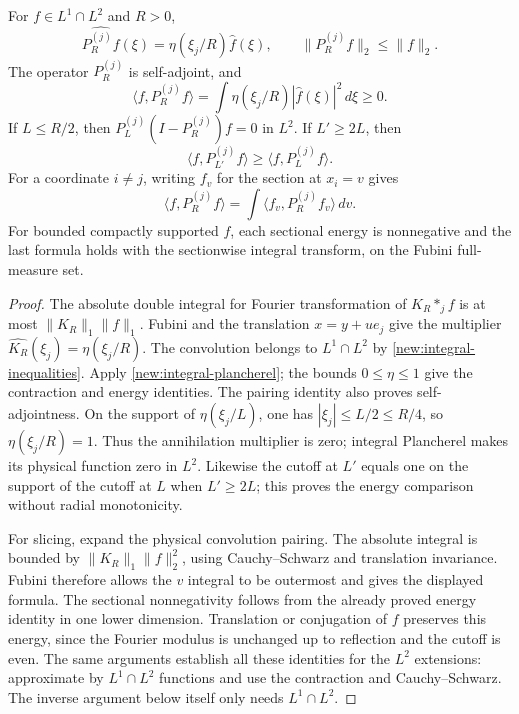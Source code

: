 \documentclass[11pt]{article}
\theoremstyle{definition}
\begin{document}
\begin{lemma}\label{new:multiplier-facts}
For $f\in L^1\cap L^2$ and $R>0$,
\[
 \widehat{P_R^{(j)}f}(\xi)=\eta(\xi_j/R)\widehat f(\xi),
 \qquad \|P_R^{(j)}f\|_2\leq\|f\|_2.
\]
The operator $P_R^{(j)}$ is self-adjoint, and
\[
 \langle f,P_R^{(j)}f\rangle
 =\int\eta(\xi_j/R)|\widehat f(\xi)|^2\,d\xi\geq0.
\]
If $L\leq R/2$, then $P_L^{(j)}(I-P_R^{(j)})f=0$ in $L^2$. If $L'\geq2L$, then
\[
 \langle f,P_{L'}^{(j)}f\rangle\geq\langle f,P_L^{(j)}f\rangle.
\]
For a coordinate $i\ne j$, writing $f_v$ for the section at $x_i=v$ gives
\[
 \langle f,P_R^{(j)}f\rangle=\int\langle f_v,P_R^{(j)}f_v\rangle\,dv.
\]
For bounded compactly supported $f$, each sectional energy is nonnegative and the last formula
holds with the sectionwise integral transform, on the Fubini full-measure set.
\end{lemma}
\begin{proof}
The absolute double integral for Fourier transformation of $K_R*_{j}f$ is at most
$\|K_R\|_1\|f\|_1$. Fubini and the translation $x=y+ue_j$ give the multiplier
$\widehat{K_R}(\xi_j)=\eta(\xi_j/R)$. The convolution belongs to $L^1\cap L^2$ by
\cref{new:integral-inequalities}. Apply \cref{new:integral-plancherel}; the bounds
$0\leq\eta\leq1$ give the contraction and energy identities. The pairing identity also
proves self-adjointness. On the support of $\eta(\xi_j/L)$, one has
$|\xi_j|\leq L/2\leq R/4$, so $\eta(\xi_j/R)=1$. Thus the annihilation multiplier is
zero; integral Plancherel makes its physical function zero in $L^2$.
Likewise the cutoff at $L'$ equals one on the support of the cutoff at $L$ when $L'\geq2L$;
this proves the energy comparison without radial monotonicity.

For slicing, expand the physical convolution pairing. The absolute integral is bounded by
$\|K_R\|_1\|f\|_2^2$, using Cauchy--Schwarz and translation invariance. Fubini therefore
allows the $v$ integral to be outermost and gives the displayed formula. The sectional
nonnegativity follows from the already proved energy identity in one lower dimension.
Translation or conjugation of $f$ preserves this energy, since the Fourier modulus is
unchanged up to reflection and the cutoff is even. The same arguments establish all these
identities for the $L^2$ extensions: approximate by $L^1\cap L^2$ functions and use the
contraction and Cauchy--Schwarz. The inverse argument below itself only needs $L^1\cap L^2$.
\end{proof}
\end{document}
